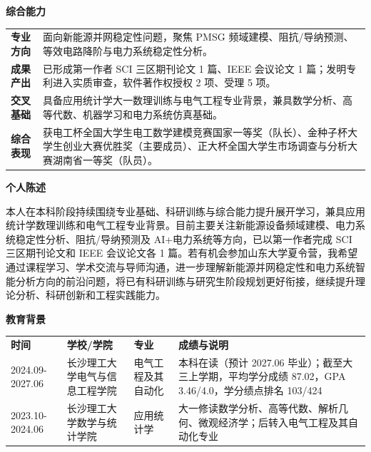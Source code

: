 \documentclass[UTF8,a4paper,10pt]{ctexart}
\newcommand{\sectiontitle}[1]{%
  \vspace{0.48em}
  {\sffamily\bfseries\Large\color{resumeblue}#1}\par
  \vspace{-0.28em}{\color{resumeblue}\rule{2.35cm}{1.05pt}}{\color{softline}\rule{\dimexpr\linewidth-2.35cm\relax}{1.05pt}}\vspace{0.13em}
}
\begin{document}
\sectiontitle{综合能力}
\begin{tabularx}{\linewidth}{L{2.25cm}Y}
\textbf{专业方向} & 面向新能源并网稳定性问题，聚焦 PMSG 频域建模、阻抗/导纳预测、等效电路降阶与电力系统稳定性分析。\\
\textbf{成果产出} & 已形成第一作者 SCI 三区期刊论文 1 篇、IEEE 会议论文 1 篇；发明专利进入实质审查，软件著作权授权 2 项、受理 5 项。\\
\textbf{交叉基础} & 具备应用统计学大一数理训练与电气工程专业背景，兼具数学分析、高等代数、机器学习和电力系统仿真基础。\\
\textbf{综合表现} & 获电工杯全国大学生电工数学建模竞赛国家一等奖（队长）、金种子杯大学生创业大赛优胜奖（主要成员）、正大杯全国大学生市场调查与分析大赛湖南省一等奖（队员）。\\
\end{tabularx}

\sectiontitle{个人陈述}
本人在本科阶段持续围绕专业基础、科研训练与综合能力提升展开学习，兼具应用统计学数理训练和电气工程专业背景。目前主要关注新能源设备频域建模、电力系统稳定性分析、阻抗/导纳预测及 AI+电力系统等方向，已以第一作者完成 SCI 三区期刊论文和 IEEE 会议论文各 1 篇。若有机会参加山东大学夏令营，我希望通过课程学习、学术交流与导师沟通，进一步理解新能源并网稳定性和电力系统智能分析方向的前沿问题，将已有科研训练与研究生阶段规划更好衔接，继续提升理论分析、科研创新和工程实践能力。

\sectiontitle{教育背景}
\begin{tabularx}{\linewidth}{L{3.0cm} L{5.1cm} L{3.8cm} Y}
\textbf{时间} & \textbf{学校/学院} & \textbf{专业} & \textbf{成绩与说明}\\
2024.09-2027.06 & 长沙理工大学电气与信息工程学院 & 电气工程及其自动化 & 本科在读（预计 2027.06 毕业）；截至大三上学期，平均学分成绩 87.02，GPA 3.46/4.0，学分绩点排名 103/424\\
2023.10-2024.06 & 长沙理工大学数学与统计学院 & 应用统计学 & 大一修读数学分析、高等代数、解析几何、微观经济学；后转入电气工程及其自动化专业\\
\end{tabularx}
\end{document}
